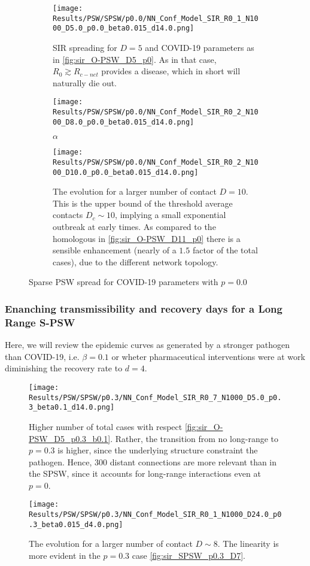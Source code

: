 \documentclass[a4paper,10pt,twoside]{book} %
\theoremstyle{definition}
\begin{document}
\begin{figure}[p]
	\centering
	\begin{subfigure}{\linewidth}
		\centering
		\texttt{[image: Results/PSW/SPSW/p0.0/NN\_Conf\_Model\_SIR\_R0\_1\_N1000\_D5.0\_p0.0\_beta0.015\_d14.0.png]}
		\caption{SIR spreading for $D = 5$ and COVID-19 parameters as in \autoref{fig:sir_O-PSW_D5_p0}. As in that case, $R_0 \gtrsim R_{c-net}$ provides a disease, which in short will naturally die out.}
		\label{fig:sir_S-PSW_D5_p0.0}
	\end{subfigure}
	\vfill	
	\begin{subfigure}{\linewidth}
		\centering
		\texttt{[image: Results/PSW/SPSW/p0.0/NN\_Conf\_Model\_SIR\_R0\_2\_N1000\_D8.0\_p0.0\_beta0.015\_d14.0.png]}
		\caption{$\alpha$}
		\label{fig:sir_S-PSW_D8_p0.0}
	\end{subfigure}
	\vfill
	\begin{subfigure}{\linewidth}
		\centering
		\texttt{[image: Results/PSW/SPSW/p0.0/NN\_Conf\_Model\_SIR\_R0\_2\_N1000\_D10.0\_p0.0\_beta0.015\_d14.0.png]}
		\caption{The evolution for a larger number of contact $D = 10$. This is the upper bound of the threshold average contacts $ D_c \sim 10$, implying a small exponential outbreak at early times. As compared to the homologous in \autoref{fig:sir_O-PSW_D11_p0} there is a sensible enhancement (nearly of a $1.5$ factor of the total cases), due to the different network topology.}
		\label{fig:sir_S-PSW_D10_p0.0}
	\end{subfigure}
	\caption{Sparse PSW spread for COVID-19 parameters with $p = 0.0$ }
	\label{fig:sir_SPSW_COVID}
\end{figure}

\clearpage
\subsubsection*{Enanching transmissibility and recovery days for a Long Range S-PSW}
Here, we will review the epidemic curves as generated by a stronger pathogen than COVID-19, i.e. $ \beta = 0.1$ or wheter pharmaceutical interventions were at work diminishing the recovery rate to $d = 4$.

\begin{figure}[H]
		\texttt{[image: Results/PSW/SPSW/p0.3/NN\_Conf\_Model\_SIR\_R0\_7\_N1000\_D5.0\_p0.3\_beta0.1\_d14.0.png]}
	\caption{Higher number of total cases with respect \autoref{fig:sir_O-PSW_D5_p0.3_b0.1}. Rather, the transition from no long-range to $ p= 0.3$ is higher, since the underlying structure constraint the pathogen. Hence, $ 300$ distant connections are more relevant than in the SPSW, since it accounts for long-range interactions even at $ p=0$.}
	\label{fig:sir_SPSW_p0.3_D7}
\end{figure}
\begin{figure}[H]
	\texttt{[image: Results/PSW/SPSW/p0.3/NN\_Conf\_Model\_SIR\_R0\_1\_N1000\_D24.0\_p0.3\_beta0.015\_d4.0.png]}
\caption{The evolution for a larger number of contact $D \sim 8$. The linearity is more evident in the $p = 0.3$ case \autoref{fig:sir_SPSW_p0.3_D7}.}
\label{fig:sir_SPSW_p0.3_D24}
\end{figure}
\end{document}
